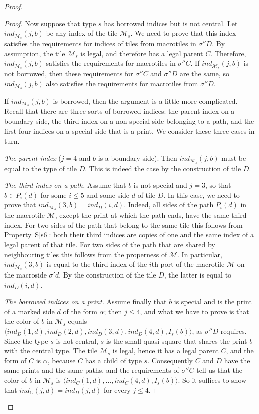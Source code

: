 \documentclass[10pt,a4paper]{amsart}
\newcommand{\ind}{\textit{ind}}
\newcommand{\pair}[1]{\langle #1\rangle}
\begin{document}
\begin{proof}
\begin{proof}
Now suppose that type $s$ has borrowed indices but is not central. Let $\ind_{\mathcal M_s}(j,b)$ be any index of the tile $\mathcal M_s$.
We need to prove that this index satisfies the requirements for indices
of tiles from macrotiles in $\sigma'' D$.
By assumption, the tile $\mathcal M_s$ is legal, and therefore
has a legal parent $C$. Therefore, $\ind_{\mathcal M_s}(j,b)$
satisfies the requirements for macrotiles in $\sigma'' C$. If
$\ind_{\mathcal M_s}(j,b)$ is not borrowed, then these requirements for
$\sigma'' C$ and $\sigma'' D$ are the same, so $\ind_{\mathcal M_s}(j,b)$
also satisfies the requirements for macrotiles from $\sigma'' D$.

If
$\ind_{\mathcal M_s}(j,b)$ is borrowed, then the argument is a little more complicated.
Recall that there are three sorts of borrowed indices: the parent index on a boundary side, the
third index on a non-special side belonging to a path, and the first four indices on a special
side that is a print. We consider these three cases in turn.

\emph{The parent index} ($j=4$ and $b$ is a boundary side). Then $\ind_{\mathcal M_s}(j,b)$
must be equal to the type of tile $D$. This is indeed the case
by the construction of tile $D$.

\emph{The third index on a path.} Assume that $b$ is not special and $j=3$, so that
$b\in P_i(d)$ for some $i\le5$ and some side $d$ of tile $D$.
In this case, we need to prove that $\ind_{\mathcal M_s}(3,b)=\ind_D(i,d)$.
Indeed, all sides of the path $P_i(d)$ in the macrotile $\mathcal M$, except the print at which
the path ends, have the same third index. For two sides of the path that belong to the same tile
this follows from Property~S\ref{s6}: both their third indices are copies of one and the same
index of a legal parent of that tile. For two sides of the path that are shared by neighbouring
tiles this follows from the properness of $\mathcal M$.
In particular, $\ind_{\mathcal M_s}(3,b)$ is  equal to the third index of the $i$th port of the macrotile $\mathcal M$
on the macroside
$\sigma' d$. By the construction of the tile $D$, the latter is equal to $\ind_D(i,d)$.

\emph{The borrowed indices on a print.} Assume finally that $b$ is special and is the print of a
marked side $d$ of the form $\alpha$; then $j\le 4$, and what we have to prove is that the color
of $b$ in $\mathcal M_s$ equals
$\pair{\ind_D(1,d),\ind_D(2,d),\ind_D(3,d),\ind_D(4,d),I_s(b)}$, as $\sigma''D$ requires. Since
the type $s$ is not central, $s$ is the small quasi-square that shares the print $b$ with the
central type. The tile $\mathcal M_s$ is legal, hence it has a legal parent $C$, and the form of
$C$ is $\alpha$, because $C$ has a child of type $s$. Consequently $C$ and $D$ have the same
prints and the same paths, and the requirements of $\sigma''C$ tell us that the color of $b$ in
$\mathcal M_s$ is $\pair{\ind_C(1,d),\dots,\ind_C(4,d),I_s(b)}$. So it suffices to show that
$\ind_C(j,d)=\ind_D(j,d)$ for every $j\le4$.


\end{proof}
\end{proof}
\end{document}
